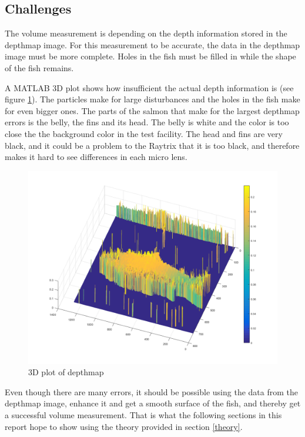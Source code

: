 \subsection{Challenges}

The volume measurement is depending on the depth information stored in the depthmap image. For this measurement to be accurate, the data in the depthmap image must be more complete. Holes in the fish must be filled in while the shape of the fish remains.

A MATLAB 3D plot shows how insufficient the actual depth information is (see figure \ref{fig:matlab3D}). The particles make for large disturbances and the holes in the fish make for even bigger ones. The parts of the salmon that make for the largest depthmap errors is the belly, the fins and its head. The belly is white and the color is too close the the background color in the test facility. The head and fins are very black, and it could be a problem to the Raytrix that it is too black, and therefore makes it hard to see differences in each micro lens.

\begin{figure}[H]
    \centering
    \includegraphics[width=.7\linewidth]{images/aim_of_study/original_3D_82}
    \caption{3D plot of depthmap}
    \label{fig:matlab3D}
\end{figure}

Even though there are many errors, it should be possible using the data from the depthmap image, enhance it and get a smooth surface of the fish, and thereby get a successful volume measurement. That is what the following sections in this report hope to show using the theory provided in section \ref{theory}.
